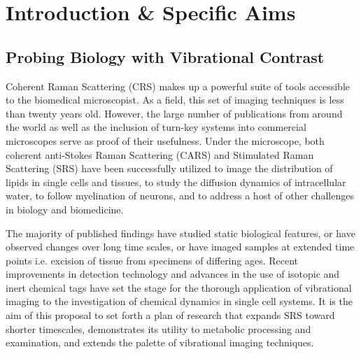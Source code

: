 
\chapter{Introduction \& Specific Aims} %

\label{Chapter1} %


\newcommand{\keyword}[1]{\textbf{#1}}
\newcommand{\tabhead}[1]{\textbf{#1}}
\newcommand{\code}[1]{\texttt{#1}}
\newcommand{\file}[1]{\texttt{\bfseries#1}}
\newcommand{\option}[1]{\texttt{\itshape#1}}

\section{Probing Biology with Vibrational Contrast}
Coherent Raman Scattering (CRS) makes up a powerful suite of tools accessible to the biomedical microscopist.  As a field, this set of imaging techniques is less than twenty years old.  However, the large number of publications from around the world as well as the inclusion of turn-key systems into commercial microscopes serve as proof of their usefulness. Under the microscope, both coherent anti-Stokes Raman Scattering (CARS) and Stimulated Raman Scattering (SRS) have been successfully utilized to image the distribution of lipids in single cells and tissues, to study the diffusion dynamics of intracellular water, to follow myelination of neurons, and to address a host of other challenges in biology and biomedicine.~\cite{Prince:2017aa, Camp-Jr:2015aa, doi:10.1002/9783527808465.EMC2016.8365}  

The majority of published findings have studied static biological features, or have observed changes over long time scales, or have imaged samples at extended time points i.e. excision of tissue from specimens of differing ages.\cite{Camp-Jr:2015aa,doi:10.1002/9783527808465.EMC2016.8365,C5CS00693G} Recent improvements in detection technology and advances in the use of isotopic and inert chemical tags have set the stage for the thorough application of vibrational imaging to the investigation of chemical dynamics in single cell systems. It is the aim of this proposal to set forth a plan of research that expands SRS toward shorter timescales, demonstrates its utility to metabolic processing and examination, and extends the palette of vibrational imaging techniques.

